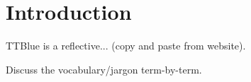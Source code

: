 \chapter{Introduction}

TTBlue is a reflective...  (copy and paste from website).

Discuss the vocabulary/jargon term-by-term.


%
%
%
%